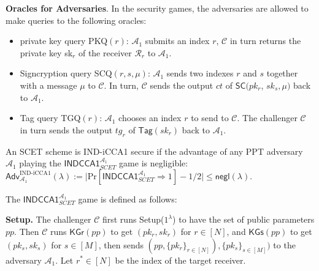\documentclass[a4paper,11pt,onecolumn]{elsarticle}
\def\Pr{\mathrm{Pr}}
\begin{document}
	\noindent \textbf{Oracles for Adversaries}. In the security games, the adversaries are allowed to make queries to the following oracles:
		\begin{itemize}
		\item private key query  PKQ$(r)$: $\mathcal{A}_1$ submits an index $r $, $\mathcal{C}$ in turn returns the private key sk$_{r}$ of the receiver $\mathcal{R}_{r}$  to $\mathcal{A}_1$. 
		\item Signcryption query SCQ$(r,s,\mu)$: $\mathcal{A}_1$ sends two indexes $r$ and $s$ together with a message $\mu$ to $\mathcal{C}$. In turn, $\mathcal{C}$ sends the output $ct$ of $\textsf{SC}(pk_{r}$, $sk_{s},\mu)$ back to $\mathcal{A}_1$.
		\item Tag query TGQ$(r)$: $\mathcal{A}_1$ chooses an index $r $ to send to $\mathcal{C}$. The challenger $\mathcal{C}$ in turn sends the output $tg_{r}$ of $\textsf{Tag}(sk_{r})$ back to $\mathcal{A}_1$.
	\end{itemize}
\fi	
	

	

			
			\begin{definition} \label{indcca2}
				An SCET scheme is IND-iCCA1 secure if the advantage of  any PPT adversary  $\mathcal{A}_1$ playing the $\mathsf{INDCCA1}^{\mathcal{A}_1}_{SCET}$ game is negligible: $\mathsf{Adv}^{\text{IND-iCCA1}}_{\mathcal{A}_1}(\lambda):= \vert \Pr[\mathsf{INDCCA1}^{\mathcal{A}_1}_{SCET} \Rightarrow 1] -1/2\vert\leq \mathsf{negl}(\lambda).$
				
			\end{definition}
			
	The $\mathsf{INDCCA1}^{\mathcal{A}_1}_{SCET}$ game is defined as follows:
			
		 \textbf{Setup.} The challenger  $\mathcal{C}$ first runs \textsf{Setup($1^{\lambda}$)} to have the set of  public parameters $pp$. Then $\mathcal{C}$ runs $\textsf{KGr}(pp)$ to get $(pk_{r}, sk_{r})$ for $r\in[N]$, and $\textsf{KGs}(pp)$ to get $(pk_{s}, sk_{s})$ for $s\in[M]$, then sends $(pp, \{pk_{r}\}_{r \in [N]}), \{pk_{s}\}_{s \in [M]})$ to the adversary $\mathcal{A}_1$. Let $r^*\in[N]$ be the index of the target receiver.
		 
\end{document}

